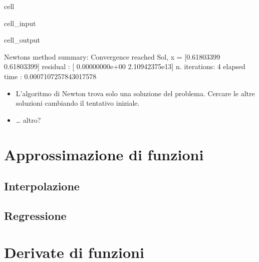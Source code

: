 \documentclass[letterpaper,10pt,italian]{jupyterBook}
\begin{document}
\begin{sphinxuseclass}{cell}
\begin{sphinxVerbatimInput}
\begin{sphinxuseclass}{cell_input}
\end{sphinxuseclass}\end{sphinxVerbatimInput}
\begin{sphinxVerbatimOutput}

\begin{sphinxuseclass}{cell_output}
\begin{sphinxVerbatim}[commandchars=\\\{\}]
Newton\PYGZsq{}s method summary: 
Convergence reached
Sol, x = [\PYGZhy{}0.61803399 \PYGZhy{}0.61803399]
residual     : [ 0.00000000e+00 \PYGZhy{}2.10942375e\PYGZhy{}13]
n. iterations: 4
elapsed time : 0.0007107257843017578
\end{sphinxVerbatim}

\end{sphinxuseclass}\end{sphinxVerbatimOutput}

\end{sphinxuseclass}\begin{itemize}
\item {} 
\sphinxAtStartPar
{} L’algoritmo di Newton trova solo una soluzione del problema. Cercare le altre soluzioni cambiando il tentativo iniziale.

\item {} 
\sphinxAtStartPar
{} … altro?

\end{itemize}

\sphinxstepscope


\chapter{Approssimazione di funzioni}
\label{\detokenize{ch/numerics/approximation:approssimazione-di-funzioni}}\label{\detokenize{ch/numerics/approximation::doc}}

\section{Interpolazione}
\label{\detokenize{ch/numerics/approximation:interpolazione}}

\section{Regressione}
\label{\detokenize{ch/numerics/approximation:regressione}}
\sphinxstepscope


\chapter{Derivate di funzioni}
\label{\detokenize{ch/numerics/derivatives:derivate-di-funzioni}}\label{\detokenize{ch/numerics/derivatives::doc}}
\end{document}
